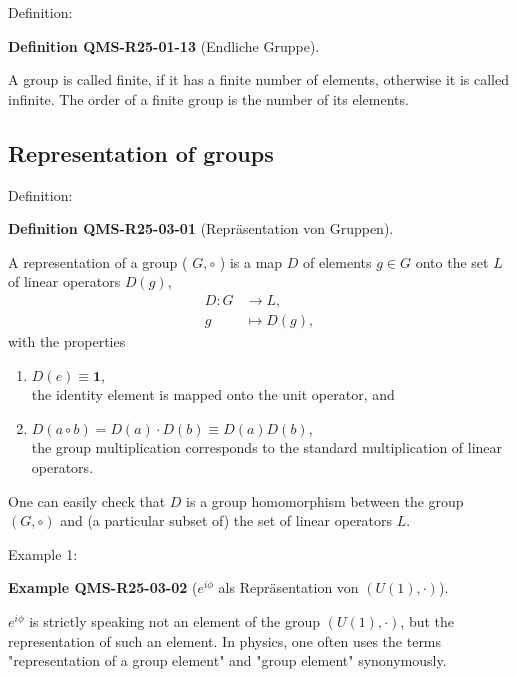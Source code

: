 \documentclass[10pt, letterpaper]{article}
\newcommand{\CustomHeading}[3]{%
  \par\medskip\noindent%
  \textbf{#1 #2} \textnormal{(#3)}.\enskip%
}
\newenvironment{DEF}[2]{\begin{unitbox}\CustomHeading{Definition}{#1}{#2}}{\end{unitbox}}
\newenvironment{EXA}[2]{\begin{unitbox}\CustomHeading{Example}{#1}{#2}}{\end{unitbox}}
\begin{document}
Definition: 

\begin{DEF}{QMS-R25-01-13}{Endliche Gruppe}
A group is called finite, if it has a finite number of elements, otherwise it is called infinite. The order of a finite group is the number of its elements.
\end{DEF}



\pagebreak

\subsection{Representation of groups}

Definition: 

\begin{DEF}{QMS-R25-03-01}{Repräsentation von Gruppen}
A representation of a group ( $G, \circ$ ) is a map $D$ of elements $g \in G$ onto the set $L$ of linear operators $D(g)$,
$$
\begin{aligned}
D: G & \rightarrow L, \\
g & \mapsto D(g),
\end{aligned}
$$
with the properties\\
\begin{enumerate}[label=(\roman*)]
  \item $D(e) \equiv \mathbf{1}$,\\
  the identity element is mapped onto the unit operator, and

  \item $D(a \circ b) = D(a) \cdot D(b) \equiv D(a)D(b)$,\\
  the group multiplication corresponds to the standard multiplication of linear operators.
\end{enumerate}

One can easily check that $D$ is a group homomorphism between the group $(G, \circ)$ and (a particular subset of) the set of linear operators $L$.
\end{DEF}


Example 1: 

\begin{EXA}{QMS-R25-03-02}{$e^{i \phi}$ als Repräsentation von $(U(1), \cdot)$}
$e^{i \phi}$ is strictly speaking not an element of the group $(U(1), \cdot)$, but the representation of such an element. In physics, one often uses the terms "representation of a group element" and "group element" synonymously.
\end{EXA}
\end{document}
